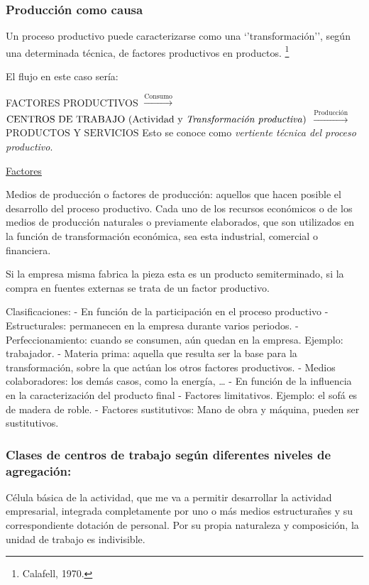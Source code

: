 \documentclass[12pt]{report} %
\begin{document}
\subsubsection*{Producción como causa}

Un proceso productivo puede caracterizarse como una `'transformación'',
según una determinada técnica, de factores productivos en productos.
\footnote{Calafell, 1970.}

El flujo en este caso sería:

FACTORES PRODUCTIVOS \(\xrightarrow{\text{Consumo}}\)
\(\text{CENTROS DE TRABAJO (Actividad y \textit{Transformación productiva})}\)
\(\xrightarrow{\text{Producción}}\) \(\text{PRODUCTOS Y SERVICIOS}\)
Esto se conoce como \emph{vertiente técnica del proceso productivo}.

\underline{Factores}

Medios de producción o factores de producción: aquellos que hacen
posible el desarrollo del proceso productivo. Cada uno de los recursos
económicos o de los medios de producción naturales o previamente
elaborados, que son utilizados en la función de transformación
económica, sea esta industrial, comercial o financiera.

Si la empresa misma fabrica la pieza esta es un producto semiterminado,
si la compra en fuentes externas se trata de un factor productivo.

Clasificaciones: - En función de la participación en el proceso
productivo - Estructurales: permanecen en la empresa durante varios
periodos. - Perfeccionamiento: cuando se consumen, aún quedan en la
empresa. Ejemplo: trabajador. - Materia prima: aquella que resulta ser
la base para la transformación, sobre la que actúan los otros factores
productivos. - Medios colaboradores: los demás casos, como la energía,
\ldots{} - En función de la influencia en la caracterización del
producto final - Factores limitativos. Ejemplo: el sofá es de madera de
roble. - Factores sustitutivos: Mano de obra y máquina, pueden ser
sustitutivos.

\subsubsection*{Clases de centros de trabajo según diferentes niveles de agregación:}

\begin{definicion}
Célula básica de la actividad, que me va a permitir desarrollar la actividad empresarial, integrada completamente por uno o más medios estructurañes y su correspondiente dotación de personal. Por su propia naturaleza y composición, la unidad de trabajo es indivisible.
\end{definicion}
\end{document}
